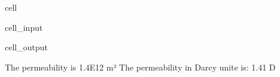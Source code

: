\documentclass[letterpaper,10pt,english]{jupyterBook}
\begin{document}
\begin{sphinxuseclass}{cell}
\begin{sphinxVerbatimInput}
\begin{sphinxuseclass}{cell_input}
\end{sphinxuseclass}\end{sphinxVerbatimInput}
\begin{sphinxVerbatimOutput}

\begin{sphinxuseclass}{cell_output}
\begin{sphinxVerbatim}[commandchars=\\\{\}]
The permeability is 1.4E\PYGZhy{}12 m²
The permeability in Darcy unite is: 1.41 D
\end{sphinxVerbatim}

\end{sphinxuseclass}\end{sphinxVerbatimOutput}

\end{sphinxuseclass}
\end{document}
